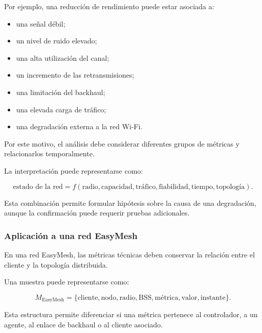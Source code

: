 Por ejemplo, una reducción de rendimiento puede estar asociada a:

\begin{itemize}
    \item una señal débil;

    \item un nivel de ruido elevado;

    \item una alta utilización del canal;

    \item un incremento de las retransmisiones;

    \item una limitación del backhaul;

    \item una elevada carga de tráfico;

    \item una degradación externa a la red Wi-Fi.
\end{itemize}

Por este motivo, el análisis debe considerar diferentes grupos de
métricas y relacionarlos temporalmente.

La interpretación puede representarse como:

\[
    \text{estado de la red}
    =
    f
    \left(
        \text{radio},
        \text{capacidad},
        \text{tráfico},
        \text{fiabilidad},
        \text{tiempo},
        \text{topología}
    \right).
\]

Esta combinación permite formular hipótesis sobre la causa de una
degradación, aunque la confirmación puede requerir pruebas adicionales.


\subsubsection*{Aplicación a una red EasyMesh}

En una red EasyMesh, las métricas técnicas deben conservar la relación
entre el cliente y la topología distribuida.

Una muestra puede representarse como:

\[
    M_{\mathrm{EasyMesh}}
    =
    \{
        \text{cliente},
        \text{nodo},
        \text{radio},
        \text{BSS},
        \text{métrica},
        \text{valor},
        \text{instante}
    \}.
\]

Esta estructura permite diferenciar si una métrica pertenece al
controlador, a un agente, al enlace de backhaul o al cliente asociado.

